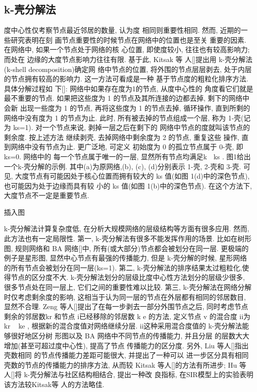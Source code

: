 \subsection{k-壳分解法}
度中心性仅考察节点最近邻居的数量, 认为度 相同则重要性相同. 然而, 近期的一些研究表明在刻 画节点重要性的时候节点在网络中的位置也是至关 重要的因素. 在网络中, 如果一个节点处于网络的核 心位置, 即使度较小, 往往也有较高影响力; 而处在 边缘的大度节点影响力往往有限. 基于此, Kitsak 等 人[]提出用 k-壳分解法(k-shell decomposition)确定网 络中节点的位置, 将外围的节点层层剥去, 处于内层 的节点拥有较高的影响力. 这一方法可看成是一种 基于节点度的粗粒化排序方法. 具体分解过程如 下[]: 网络中如果存在度为1的节点, 从度中心性的 角度看它们就是最不重要的节点. 如果把这些度为 1 的节点及其所连接的边都去掉, 剩下的网络中会新 出现一些度为 1 的节点, 再将这些度为 1 的节点去掉, 循环操作, 直到所剩的网络中没有度为 1 的节点为止. 此时, 所有被去掉的节点组成一个层, 称为 1-壳(记 为 ks=1). 对一个节点来说, 剥掉一层之后在剩下的 网络中节点的度就叫该节点的剩余度. 按上述方法 继续剥壳, 去掉网络中剩余度为 2 的节点, 重复这些 操作, 直到网络中没有节点为止. 更广泛地, 可定义 初始度为 0 的孤立节点属于 0-壳, 即 ks=0. 网络中的 每一个节点属于唯一的一层, 显然所有节点均满足k  ks .
			图1给出一个k-壳分解的示例. 其中(a)为原网络,(b), (c), (d)分别表示 1-壳, 2-壳和 3-壳. 可见, 大度节点有可能因处于核心位置而拥有较大的 ks 值(如图 1(d)中的深色节点), 也可能因为处于边缘而具有较 小的 ks 值(如图 1(b)中的深色节点). 在这个方法下, 大度节点不一定是重要节点.

			插入图

			k-壳分解法计算复杂度低, 在分析大规模网络的层级结构等方面有很多应用. 然而, 此方法也有一定局限性. 第一, k-壳分解法有很多不能发挥作用的场景. 比如在树形图, 规则网络和 BA 网络[]中, 所有(或大部分)节点都会被划分在同一层. 更极端的例子是星形图, 显然中心节点有最强的传播能力, 但是 k-壳分解的时候, 星形网络的所有节点会被划分在同一层(ks=1). 第二, k-壳分解法的排序结果太过粗粒化,使得节点的区分度不大. k-壳分解法划分的层级比度中心性方法划分的层级少很多, 很多节点处在同一层上, 它们之间的重要性难以比较. 第三, k-壳分解法在网络分解时仅考虑剩余度的影响, 这相当于认为同一层的节点在外层都有相同的邻居数目, 显然不合理. Zeng 等人[]提出了在每一步剥去一部分外围节点之后, 同时考虑节点剩余的邻居数kr 和节点 i已经移除的邻居数 k e 的方法, 定义节点 v 的混合度 ii为 kr ke , 根据新的混合度值对网络继续分层. ii这种采用混合度值的 k-壳分解法能够很好地区分树 形图以及 BA 网络中不同节点的传播能力, 并且分层 的层数大大增加(甚至可超过度中心性), 提高了节点 传播能力的区分度. 另外, Liu 等人[]指出壳数相同 的节点传播能力差距可能很大, 并提出了一种可以 进一步区分具有相同壳数的节点的传播能力的排序方法, 从而较 Kitsak 等人[]的方法有所进步; Hu 等 人[]将 k-壳分解法与社区结构相结合, 提出一种改 良指标, 在SIR模型上的实验表明该方法较Kitsak等 人的方法略佳.
			
